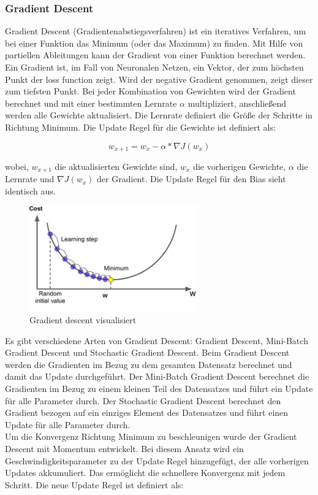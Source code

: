 \subsubsection{Gradient Descent}
Gradient Descent (Gradientenabstiegsverfahren) ist ein iteratives Verfahren, um bei einer Funktion das Minimum (oder das Maximum) zu finden.
Mit Hilfe von partiellen Ableitungen kann der Gradient von einer Funktion berechnet werden. Ein Gradient ist, im Fall von Neuronalen
Netzen, ein Vektor, der zum höchsten Punkt der \gls{loss function} zeigt. Wird der negative Gradient genommen, zeigt dieser zum tiefsten Punkt.
Bei jeder Kombination von Gewichten wird der Gradient berechnet und mit einer bestimmten Lernrate $ \alpha $ multipliziert, anschließend werden
alle Gewichte aktualisiert. Die Lernrate definiert die Größe der Schritte in Richtung Minimum. Die Update Regel für die Gewichte ist definiert als:

\begin{equation}
  w_{x+1} = w_x - \alpha * \nabla J(w_x)
\end{equation}

wobei, $w_{x+1}$ die aktualisierten Gewichte sind, $w_x$ die vorherigen Gewichte, $ \alpha $ die Lernrate und $\nabla J(w_x)$ der Gradient.
Die Update Regel für den Bias sieht identisch aus.

\begin{figure}[H]
  \centering
  \includegraphics[width=0.65\textwidth]{resources/cnn/gradient-descent.jpg}
  \caption{
    Gradient descent visualisiert
    \cite{gradient-descent}
  }
  \label{image:gradient-descent}
\end{figure}

Es gibt verschiedene Arten von Gradient Descent: Gradient Descent, Mini-Batch Gradient Descent und Stochastic Gradient Descent.
Beim Gradient Descent
werden die Gradienten im Bezug zu dem gesamten Datensatz berechnet und damit das Update durchgeführt. Der Mini-Batch Gradient Descent berechnet
die Gradienten im Bezug zu einem kleinen Teil des Datensatzes und führt ein Update für alle Parameter durch. Der Stochastic Gradient Descent
berechnet den Gradient bezogen auf ein einziges Element des Datensatzes und führt einen Update für alle Parameter durch.
\\
Um die Konvergenz Richtung Minimum zu beschleunigen wurde der Gradient Descent mit Momentum entwickelt. Bei diesem Ansatz wird ein
Geschwindigkeitsparameter zu der Update Regel hinzugefügt, der alle vorherigen Updates akkumuliert.
Das ermöglicht die schnellere Konvergenz mit jedem Schritt. Die neue Update Regel ist definiert als:

